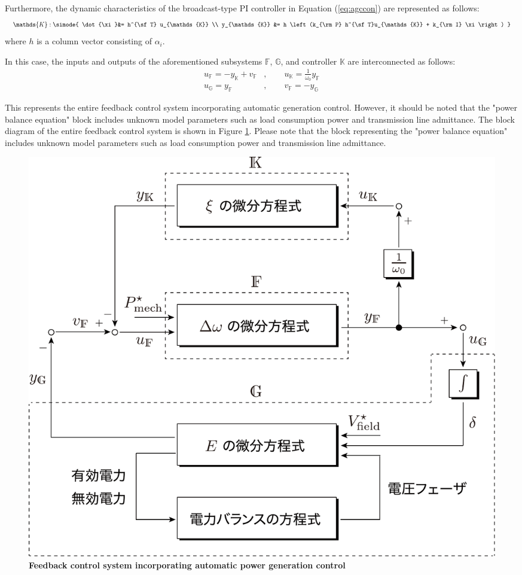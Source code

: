 \documentclass[graybox, envcountchap]{svmult}
\begin{document}
Furthermore, the dynamic characteristics of the broadcast-type PI controller in
Equation (\ref{eq:agccon}) are represented as follows:
\begin{equation}\label{eq:condsK}
  \mathds{K}: \simode{
  \dot{\xi}&=  h^{\sf T} u_{\mathds{K}} \\
  y_{\mathds{K}} &= h \left(k_{\rm P} h^{\sf T}u_{\mathds{K}} +  k_{\rm I} \xi \right)
  }
\end{equation}
where $h$ is a column vector consisting of $\alpha_i$.

In this case, the inputs and outputs of the aforementioned subsystems
$\mathds{F}$, $\mathds{G}$, and controller $\mathds{K}$ are interconnected as
follows:
\begin{subequations}\label{eq:connds}
\begin{align}
u_{\mathds{F}} = - y_{\mathds{K}} + v_{\mathds{F}}&
,\qquad u_{\mathds{K}} = \frac{1}{\omega_0} y_{\mathds{F}}	\label{eq:connds1}
\\
u_{\mathds{G}} = y_{\mathds{F}}&
,\qquad
v_{\mathds{F}} = - y_{\mathds{G}}		\label{eq:connds2}
\end{align}
\end{subequations}

This represents the entire feedback control system incorporating automatic
generation control. However, it should be noted that the "power balance
equation" block includes unknown model parameters such as load consumption power
and transmission line admittance. The block diagram of the entire feedback
control system is shown in Figure \ref{fig:nonlinBD}. Please note that the block
representing the "power balance equation" includes unknown model parameters such
as load consumption power and transmission line admittance.

\begin{figure}[t]
\centering
\includegraphics[width = .85\linewidth]{figs/nonlinBD}
\medskip
\caption{\textbf{Feedback control system incorporating automatic power generation control}}
\label{fig:nonlinBD}
\medskip
\end{figure}
\end{document}
